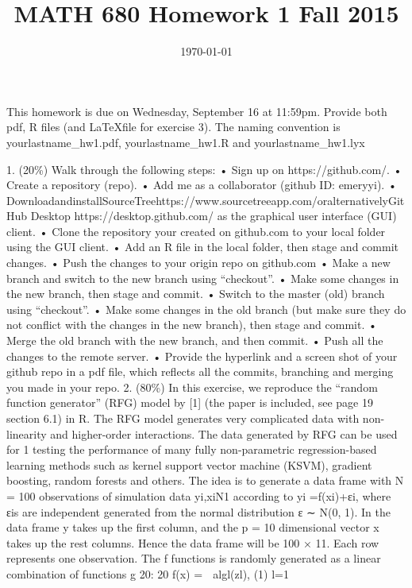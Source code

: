 \documentclass{article}
\title{MATH 680 Homework 1 Fall 2015}
\date{\today}
\begin{document}
\maketitle

This homework is due on Wednesday, September 16 at 11:59pm. Provide both pdf, R
files (and \LaTeX file for exercise 3). The naming convention is 
yourlastname\_hw1.pdf, yourlastname\_hw1.R and yourlastname\_hw1.lyx

\cite{friedman2001greedy}

1. (20\%) Walk through the following steps:
• Sign up on https://github.com/.
• Create a repository (repo).
• Add me as a collaborator (github ID: emeryyi).
• DownloadandinstallSourceTreehttps://www.sourcetreeapp.com/oralternativelyGitHub Desktop https://desktop.github.com/ as the graphical user interface (GUI) client.
• Clone the repository your created on github.com to your local folder using the GUI client.
• Add an R file in the local folder, then stage and commit changes.
• Push the changes to your origin repo on github.com
• Make a new branch and switch to the new branch using “checkout”.
• Make some changes in the new branch, then stage and commit.
• Switch to the master (old) branch using “checkout”.
• Make some changes in the old branch (but make sure they do not conflict with the changes in the new branch), then stage and commit.
• Merge the old branch with the new branch, and then commit.
• Push all the changes to the remote server.
• Provide the hyperlink and a screen shot of your github repo in a pdf file, which reflects all the commits, branching and merging you made in your repo.
2. (80\%) In this exercise, we reproduce the “random function generator” (RFG) model by [1] (the paper is included, see page 19 section 6.1) in R. The RFG model generates very complicated data with non-linearity and higher-order interactions. The data generated by RFG can be used for
1
testing the performance of many fully non-parametric regression-based learning methods such as kernel support vector machine (KSVM), gradient boosting, random forests and others.
The idea is to generate a data frame with N = 100 observations of simulation data {yi,xi}N1 according to
yi =f(xi)+εi,
where εis are independent generated from the normal distribution ε ∼ N(0, 1). In the data frame y takes up the first column, and the p = 10 dimensional vector x takes up the rest columns. Hence the data frame will be 100 × 11. Each row represents one observation. The f functions is randomly generated as a linear combination of functions {g }20:
20
f(x) = 􏰧 algl(zl), (1) l=1
\end{document}
